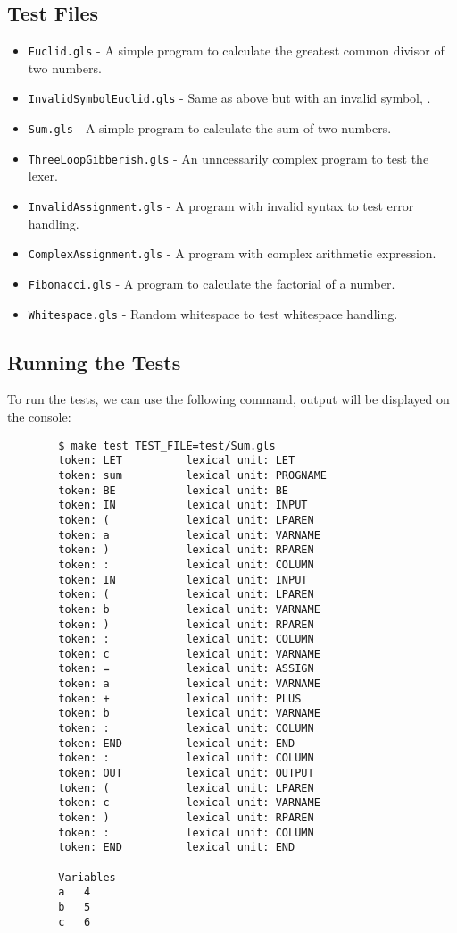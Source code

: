 \documentclass{article}
\begin{document}
	\subsection{Test Files}
	\begin{itemize}
		\item \texttt{Euclid.gls} - A simple program to calculate the greatest common divisor of two numbers.
		\item \texttt{InvalidSymbolEuclid.gls} - Same as above but with an invalid symbol, .
		\item \texttt{Sum.gls} - A simple program to calculate the sum of two numbers.
		\item \texttt{ThreeLoopGibberish.gls} - An unncessarily complex program to test the lexer.
		\item \texttt{InvalidAssignment.gls} - A program with invalid syntax to test error handling.
		\item \texttt{ComplexAssignment.gls} - A program with complex arithmetic expression.
		\item \texttt{Fibonacci.gls} - A program to calculate the factorial of a number.
		\item \texttt{Whitespace.gls} - Random whitespace to test whitespace handling.
	\end{itemize}

	\subsection{Running the Tests}
	To run the tests, we can use the following command, output will be displayed on the console:
	\begin{verbatim}
		$ make test TEST_FILE=test/Sum.gls
		token: LET        	lexical unit: LET
		token: sum        	lexical unit: PROGNAME
		token: BE         	lexical unit: BE
		token: IN         	lexical unit: INPUT
		token: (          	lexical unit: LPAREN
		token: a          	lexical unit: VARNAME
		token: )          	lexical unit: RPAREN
		token: :          	lexical unit: COLUMN
		token: IN         	lexical unit: INPUT
		token: (          	lexical unit: LPAREN
		token: b          	lexical unit: VARNAME
		token: )          	lexical unit: RPAREN
		token: :          	lexical unit: COLUMN
		token: c          	lexical unit: VARNAME
		token: =          	lexical unit: ASSIGN
		token: a          	lexical unit: VARNAME
		token: +          	lexical unit: PLUS
		token: b          	lexical unit: VARNAME
		token: :          	lexical unit: COLUMN
		token: END        	lexical unit: END
		token: :          	lexical unit: COLUMN
		token: OUT        	lexical unit: OUTPUT
		token: (          	lexical unit: LPAREN
		token: c          	lexical unit: VARNAME
		token: )          	lexical unit: RPAREN
		token: :          	lexical unit: COLUMN
		token: END        	lexical unit: END

		Variables
		a	4
		b	5
		c	6
	\end{verbatim}
\end{document}
